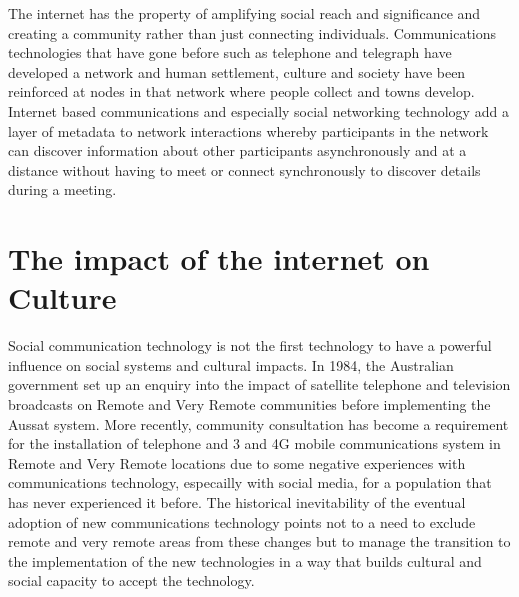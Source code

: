 The internet has the property of amplifying social reach and significance and creating a community rather than just connecting individuals. Communications technologies that have gone before such as telephone and telegraph have developed a network and human settlement, culture and society have been reinforced at nodes in that network where people collect and towns develop. Internet based communications and especially social networking technology add a layer of metadata to network interactions whereby participants in the network can discover information about other participants asynchronously and at a distance without having to meet or connect synchronously to discover details during a meeting.




\section{The impact of the internet on Culture}
Social communication technology is not the first technology to have a powerful influence on social systems and cultural impacts. In 1984, the Australian government set up an enquiry into the impact of satellite telephone and television broadcasts on Remote and Very Remote communities before implementing the Aussat system\cite{RefWorks:79}. More recently, community consultation has become a requirement for the installation of telephone and 3 and 4G mobile communications system in Remote and Very Remote locations due to some negative experiences with communications technology, especailly with social media, for a population that has never experienced it before\cite[p2]{RefWorks:451}. The historical inevitability of the eventual adoption of new communications technology points not to a need to exclude remote and very remote areas from these changes but to manage the transition to the implementation of the new technologies in a way that builds cultural and social capacity to accept the technology.

